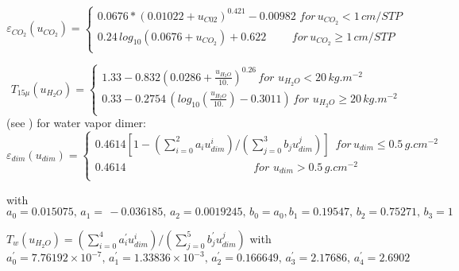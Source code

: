 \begin{equation}
\varepsilon_{CO_{2}}\left( u_{CO_{2}} \right)=\left\{ {\begin{array}{l}
 0.0676\ast \left( 0.01022+u_{C02} \right)^{0.421}-0.00982\, \, for\,
u_{CO_{2}}<1\, cm/STP \\
 0.24\, {log}_{10}\left( 0.0676+u_{CO_{2}} \right)+0.622\, \, \, \, \, \, \, \,
\, \, \, \, \, \, for\, u_{CO_{2}}\ge 1\, cm/STP \\
 \end{array}} \right.
\end{equation}

\begin{equation}
T_{15\mu }\left( u_{H_{2}O} \right)=\left\{ {\begin{array}{l}
 1.33-0.832\left( 0.0286+\frac{u_{H_{2}O}}{10.} \right)^{0.26}\, for\, {\,
u}_{H_{2}O}<20\, kg.m^{-2} \\
 0.33-0.2754\, \left( {log}_{10}\left( \frac{u_{H_{2}O}}{10.} \right)-0.3011
\right)\, for\, {\, u}_{H_{2}O}\ge 20\, kg.m^{-2} \\
 \end{array}} \right.
\end{equation}
(see \cite{Veyre:1980}) for water vapor dimer:
\newline%
$\varepsilon_{dim}\left( u_{dim} \right)=\left\{ {\begin{array}{l}
 0.4614\left[ 1-\left( \sum\limits_{i=0}^2 {a_{i}u_{dim}^{i}} \right)/\left(
\sum\limits_{j=0}^3 {b_{j}u_{dim}^{j}} \right) \right]\, \, \, for{\,
u}_{dim}\le 0.5\, g.{cm}^{-2} \\
 0.4614\, \, \, \, \, \, \, \, \, \, \, \, \, \, \, \, \, \, \, \, \, \, \,
\, \, \, \, \, \, \, \, \, \, \, \, \, \, \, \, \, \, \, \, \, \, \, \, \,
\, \, \, \, \, \, \, \, \, \, \, \, \, \, \, \, \, \, \, \, \, for\, {\,
u}_{dim}>0.5\, g.{cm}^{-2} \\
 \end{array}} \right.$

with
\begin{equation}
a_{0}=0.015075,\, a_{1}=\, -0.036185,\, a_{2}=0.0019245,\,
b_{0}=a_{0},b_{1}=0.19547,\, b_{2}=0.75271,\, b_{3}=1
\end{equation}

$T_{w}\left( u_{H_{2}O} \right)=\left( \sum\limits_{i=0}^4
{a_{i}^{'}u_{dim}^{i}} \right)/\left( \sum\limits_{j=0}^5
{b_{j}^{'}u_{dim}^{j}} \right)$
\newline
with
\newline
\begin{equation}
a_{0}^{'}=7.76192\times {10}^{-7},\, a_{1}^{'}=1.33836\times {10}^{-3},\,
a_{2}^{'}=0.166649,\, a_{3}^{'}=2.17686,\, a_{4}^{'}=2.6902\,
\end{equation}

